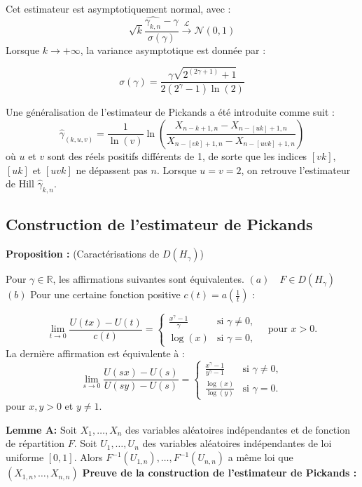 \documentclass{article}
\begin{document}
Cet estimateur est asymptotiquement normal, avec :
\[
\sqrt{k} \frac{\hat{\gamma_{k,n}} - \gamma}{\sigma(\gamma)} \xrightarrow{\mathcal{L}} \mathcal{N}(0,1)
\]
Lorsque \( k \to +\infty \), la variance asymptotique est donnée par :

\[
\sigma(\gamma)= \frac{\gamma \sqrt{2^{(2\gamma+1)}+1}}{2(2^{\gamma}-1) \ln(2)}
\]

Une généralisation de l'estimateur de Pickands a été introduite comme suit :
\[
\hat{\gamma}_{(k,u,v)} = \frac{1}{\ln(v)} \ln\left(\frac{X_{n-k+1,n} - X_{n-[uk]+1,n}}{X_{n-[vk]+1,n} - X_{n-[uvk]+1,n}}\right)
\]
où \(u\) et \(v\) sont des réels positifs différents de 1, de sorte que les indices \([vk]\), \([uk]\) et \([uvk]\) ne dépassent pas \(n\). Lorsque \(u = v = 2\), on retrouve l'estimateur de Hill \(\hat{\gamma}_{k,n}\).

\subsection{Construction de l'estimateur de Pickands}
\textbf{Proposition :} (Caractérisations de \( D(H_{\gamma}) \))

Pour \( \gamma \in \mathbb{R} \), les affirmations suivantes sont équivalentes. \newline
\( (a) \quad F \in D(H_{\gamma}) \) \newline
\( (b) \) Pour une certaine fonction positive \( c(t) = a\left( \frac{1}{t} \right) \) :

\[
\lim_{t \to 0} \frac{U(tx) - U(t)}{c(t)} = 
\begin{cases} 
\frac{x^\gamma - 1}{\gamma} & \text{si } \gamma \neq 0, \\
\log(x) & \text{si } \gamma = 0, 
\end{cases}
\quad \text{pour } x > 0.
\]
La dernière affirmation est équivalente à :
\[
\lim_{s \to 0} \frac{U(sx) - U(s)}{U(sy) - U(s)} = 
\begin{cases} 
\frac{x^\gamma - 1}{y^\gamma - 1} & \text{si } \gamma \neq 0, \\
\frac{\log(x)}{\log(y)} & \text{si } \gamma = 0.
\end{cases}
\]
pour \(x,y > 0\) et \(y \neq 1\). \newline

\textbf{Lemme A:}
Soit \(X_1, \dots, X_n\) des variables aléatoires indépendantes et de fonction de répartition \(F\).
Soit \(U_1, \dots, U_n\) des variables aléatoires indépendantes de loi uniforme \(\left[0,1\right]\). Alors \(F^{-1}(U_{1,n}), \dots, F^{-1}(U_{n,n})\) a même loi que \((X_{1,n}, \dots, X_{n,n})\)\newline
\textbf{Preuve de la construction de l'estimateur de Pickands :}
\end{document}
